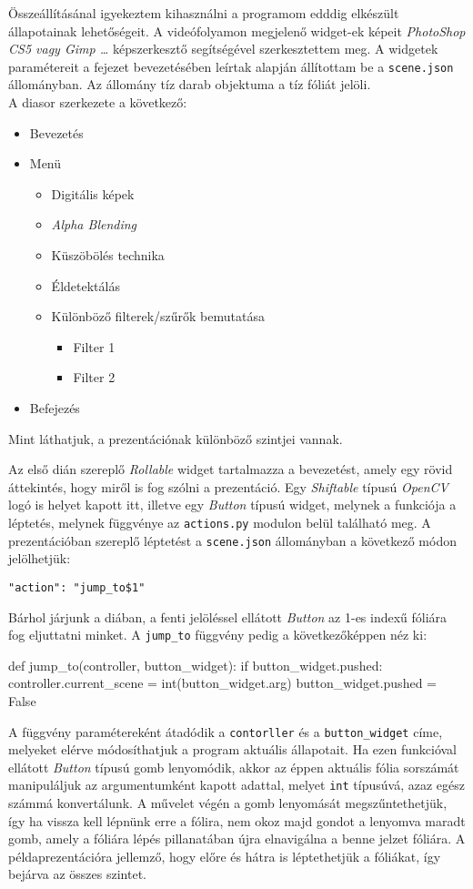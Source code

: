 Összeállításánal igyekeztem kihasználni a programom edddig elkészült állapotainak lehetőségeit. A videófolyamon megjelenő widget-ek képeit \textit{PhotoShop CS5 vagy Gimp \ldots} képszerkesztő segítségével szerkesztettem meg. A widgetek paramétereit a fejezet bevezetésében leírtak alapján állítottam be a \texttt{scene.json} állományban. Az állomány tíz darab objektuma a tíz fóliát jelöli.\\
A diasor szerkezete a következő:
\begin{itemize}
	\item Bevezetés
	\item Menü
		\begin{itemize}
			\item Digitális képek
			\item \textit{Alpha Blending}
			\item Küszöbölés technika
			\item Éldetektálás
			\item Különböző filterek/szűrők bemutatása
				\begin{itemize}
					\item Filter 1
					\item Filter 2
				\end{itemize}
		\end{itemize}
	\item Befejezés
\end{itemize}
Mint láthatjuk, a prezentációnak különböző szintjei vannak.

Az első dián szereplő \textit{Rollable} widget tartalmazza a bevezetést, amely egy rövid áttekintés, hogy miről is fog szólni a prezentáció. Egy \textit{Shiftable} típusú \textit{OpenCV} logó is helyet kapott itt, illetve egy \textit{Button} típusú widget, melynek a funkciója a léptetés, melynek függvénye az \texttt{actions.py} modulon belül található meg. A prezentációban szereplő léptetést a \texttt{scene.json} állományban a következő módon jelölhetjük:
\begin{verbatim}
"action": "jump_to$1"
\end{verbatim}
Bárhol járjunk a diában, a fenti jelöléssel ellátott \textit{Button} az 1-es indexű fóliára fog eljuttatni minket. A \texttt{jump\_to} függvény pedig a következőképpen néz ki:
\begin{python}
def jump_to(controller, button_widget):
    if button_widget.pushed:
        controller.current_scene = int(button_widget.arg)
        button_widget.pushed = False
\end{python}
A függvény paramétereként átadódik a \texttt{contorller} és a \texttt{button\_widget} címe, melyeket elérve módosíthatjuk a program aktuális állapotait. Ha ezen funkcióval ellátott \textit{Button} típusú gomb lenyomódik, akkor az éppen aktuális fólia sorszámát manipuláljuk az argumentumként kapott adattal, melyet \texttt{int} típusúvá, azaz egész számmá konvertálunk. A művelet végén a gomb lenyomását megszűntethetjük, így ha vissza kell lépnünk erre a fólira, nem okoz majd gondot a lenyomva maradt gomb, amely a fóliára lépés pillanatában újra elnavigálna a benne jelzet fóliára.
A példaprezentációra jellemző, hogy előre és hátra is léptethetjük a fóliákat, így bejárva az összes szintet.


